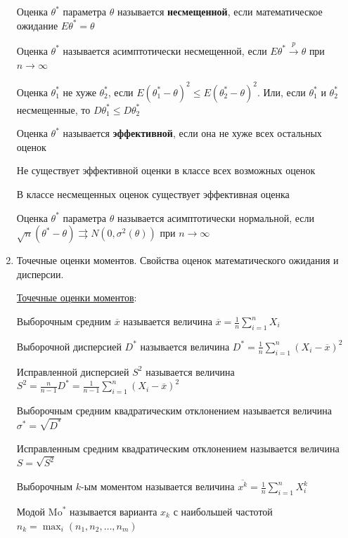 \documentclass[12pt]{article}
\begin{document}
\begin{enumerate}
    \Defs Оценка $\theta^*$ параметра $\theta$ называется \textbf{несмещенной}, если 
    математическое ожидание $E \theta^* = \theta$
        
    \Notas Оценка $\theta^*$ называется асимптотически несмещенной, если 
    $E \theta^* \overset{p}{\longrightarrow} \theta$ при $n \to \infty$

    \Defs Оценка $\theta^*_1$ не хуже $\theta^*_2$, если $E (\theta^*_1 - \theta)^2 \leq E (\theta^*_2 - \theta)^2$.
    Или, если $\theta^*_1$ и $\theta^*_2$ несмещенные, то $D \theta^*_1 \leq D \theta^*_2$

    \Defs Оценка $\theta^*$ называется \textbf{эффективной}, если она не хуже всех остальных оценок

    \Notas Не существует эффективной оценки в классе всех возможных оценок

    \begin{MyTheorem}
        \Ths В классе несмещенных оценок существует эффективная оценка
    \end{MyTheorem}

    \Defs Оценка $\theta^*$ параметра $\theta$ называется асимптотически нормальной, если 
    $\sqrt{n} (\theta^* - \theta) \rightrightarrows N(0, \sigma^2 (\theta))$ при $n \to \infty$

    \item Точечные оценки моментов. Свойства оценок математического ожидания и дисперсии.

    \hyperlink{moments_point_estimation}{Точечные оценки моментов}:

    \Defs Выборочным средним $\overline{x}$ называется величина $\overline{x} = \frac{1}{n} \sum_{i = 1}^n X_i$

    \Defs Выборочной дисперсией $D^*$ называется величина $D^* = \frac{1}{n} \sum_{i = 1}^n (X_i - \overline{x})^2$

    \Defs Исправленной дисперсией $S^2$ называется величина $S^2 = \frac{n}{n - 1} D^* = \frac{1}{n - 1} \sum_{i = 1}^n (X_i - \overline{x})^2$

    \Defs Выборочным средним квадратическим отклонением называется величина $\sigma^* = \sqrt{D^*}$

    \Defs Исправленным средним квадратическим отклонением называется величина $S = \sqrt{S^2}$

    \Defs Выборочным $k$-ым моментом называется величина $\overline{x^k} = \frac{1}{n} \sum_{i = 1}^n X_i^k$

    \Defs Модой $\mathrm{Mo}^*$ называется варианта $x_k$ с наибольшей частотой $n_k = \max_i (n_1, n_2, \dots, n_m)$


\end{enumerate}
\end{document}
